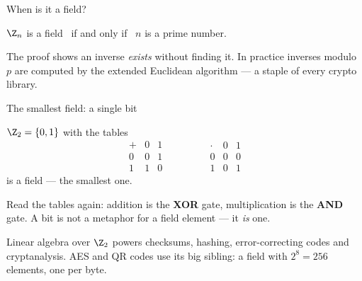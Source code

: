\begin{frame}{When is it a field?}
\begin{theorem}
$\Z_n$ is a field \ if and only if \ $n$ is a prime number.
\end{theorem}

\pause

\begin{steps}
\end{steps}

\pause

\begin{remark}
The proof shows an inverse \emph{exists} without finding it. In practice
inverses modulo $p$ are computed by the extended Euclidean algorithm — a
staple of every crypto library.
\end{remark}
\end{frame}

\begin{frame}{The smallest field: a single bit}
\begin{example}
$\Z_2 = \{0, 1\}$ with the tables
\[
\begin{array}{c|cc} + & 0 & 1 \\ \hline 0 & 0 & 1 \\ 1 & 1 & 0 \end{array}
\qquad\qquad
\begin{array}{c|cc} \cdot & 0 & 1 \\ \hline 0 & 0 & 0 \\ 1 & 0 & 1 \end{array}
\]
is a field — the smallest one.
\end{example}

\pause

Read the tables again: addition is the \textbf{XOR} gate, multiplication is
the \textbf{AND} gate. A bit is not a metaphor for a field element —
it \emph{is} one.

\pause

\begin{remark}
Linear algebra over $\Z_2$ powers checksums, hashing, error-correcting codes
and cryptanalysis. AES and QR codes use its big sibling: a field with
$2^8 = 256$ elements, one per byte.
\end{remark}
\end{frame}

